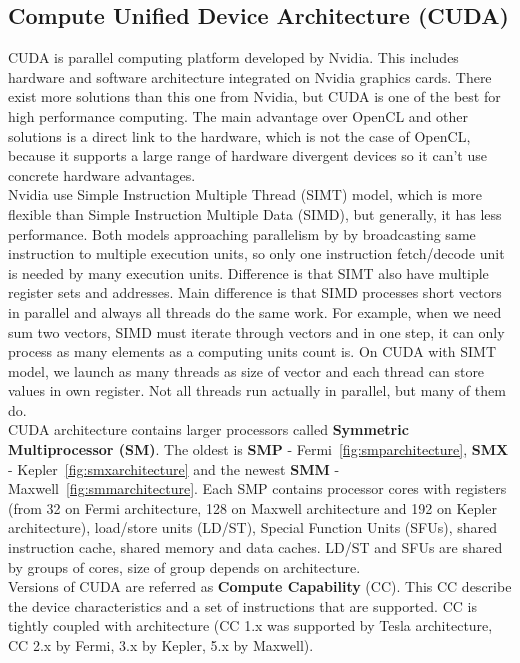 \subsection{Compute Unified Device Architecture (CUDA)}
CUDA is parallel computing platform developed by Nvidia. This includes hardware and software architecture integrated on Nvidia graphics cards. There exist more solutions than this one from Nvidia, but CUDA is one of the best for high performance computing. The main advantage over OpenCL and other solutions is a direct link to the hardware, which is not the case of OpenCL, because it supports a large range of hardware divergent devices so it can't use concrete hardware advantages. \\
Nvidia use Simple Instruction Multiple Thread (SIMT) model, which is more flexible than Simple Instruction Multiple Data (SIMD), but generally, it has less performance. Both models approaching parallelism by by broadcasting same instruction to multiple execution units, so only one instruction fetch/decode unit is needed by many execution units. Difference is that SIMT also have multiple register sets and addresses. Main difference is that SIMD processes short vectors in parallel and always all threads do the same work. For example, when we need sum two vectors, SIMD must iterate through vectors and in one step, it can only process as many elements as a computing units count is. On CUDA with SIMT model, we launch as many threads as size of vector and each thread can store values in own register. Not all threads run actually in parallel, but many of them do.\\
CUDA architecture contains larger processors called \textbf{Symmetric Multiprocessor (SM)}. The oldest is \textbf{SMP} - Fermi~\autoref{fig:smparchitecture}, \textbf{SMX} - Kepler~\autoref{fig:smxarchitecture} and the newest \textbf{SMM} - Maxwell~\autoref{fig:smmarchitecture}. Each SMP contains processor cores with registers (from 32 on Fermi architecture, 128 on Maxwell architecture and 192 on Kepler architecture), load/store units (LD/ST), Special Function Units (SFUs), shared instruction cache, shared memory and data caches. LD/ST and SFUs are shared by groups of cores, size of group depends on architecture.\\
Versions of CUDA are referred as \textbf{Compute Capability} (CC). This CC describe the device characteristics and a set of instructions that are supported. CC is tightly coupled with architecture (CC 1.x was supported by Tesla architecture, CC 2.x by Fermi, 3.x by Kepler, 5.x by Maxwell).

